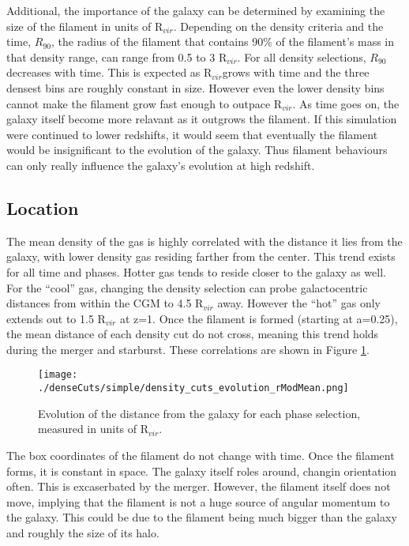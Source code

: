 \documentclass{article}
\newcommand{\rvir}{R$_{vir}$}
\begin{document}
Additional, the importance of the galaxy can be determined by examining the size
of the filament in units of R$_{vir}$. Depending on the density criteria and the
time, $R_{90}$, the radius of the filament that contains 90\% of the filament's
mass in that density range, can range from 0.5 to 3 \rvir.  For all density
selections, $R_{90}$ decreases with time. This is expected as \rvir grows with
time and the three densest bins are roughly constant in size. However even the
lower density bins cannot make the filament grow fast enough to outpace \rvir. As
time goes on, the galaxy itself become more relavant as it outgrows the filament.
If this simulation were continued to lower redshifts, it would seem that
eventually the filament would be insignificant to the evolution of the galaxy.
Thus filament behaviours can only really influence the galaxy's evolution at high
redshift. 


\subsection{Location}
The mean density of the gas is highly correlated with the distance it lies from
the galaxy, with lower density gas residing farther from the center. This trend
exists for all time and phases. Hotter gas tends to reside closer to the galaxy
as well. For the ``cool'' gas, changing the density selection can probe
galactocentric distances from within the CGM to 4.5 R$_{vir}$ away. However the
``hot'' gas only extends out to 1.5 R$_{vir}$ at z=1. Once the filament is formed
(starting at a=0.25), the mean distance of each density cut do not cross, meaning
this trend holds during the merger and starburst. These correlations are shown in
Figure \ref{rModmean}.

\begin{figure}[h!]
\centering
\texttt{[image: ./denseCuts/simple/density\_cuts\_evolution\_rModMean.png]}
\caption{Evolution of the distance from the galaxy for each phase selection,
measured in units of \rvir.}
\label{rModmean}
\end{figure}

The box coordinates of the filament do not change with time. Once the filament
forms, it is constant in space. The galaxy itself roles around, changin
orientation often. This is excaserbated by the merger. However, the filament
itself does not move, implying that the filament is not a huge source of angular
momentum to the galaxy. This could be due to the filament being much bigger than
the galaxy and roughly the size of its halo. 
\end{document}
